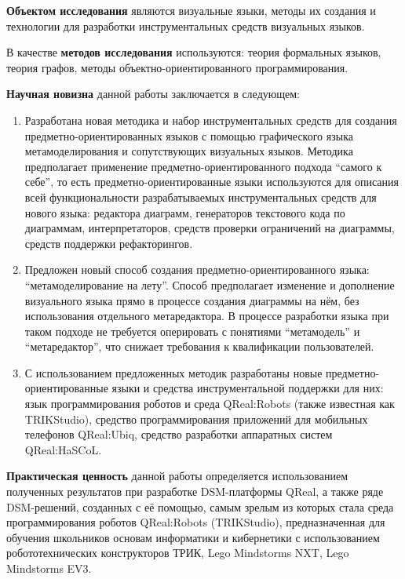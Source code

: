 \textbf{Объектом исследования} являются визуальные языки, методы их создания и технологии
для разработки инструментальных средств визуальных языков.

В качестве \textbf{методов исследования} используются: теория формальных языков, теория графов, 
методы объектно-ориентированного программирования.

\textbf{Научная новизна} данной работы заключается в следующем:
\begin{enumerate}
	\item Разработана новая методика и набор инструментальных средств для создания предметно-ориентированных 
		языков с помощью графического языка метамоделирования и сопутствующих визуальных языков.
		Методика предполагает применение предметно-ориентированного подхода "`самого к себе"', то есть
		предметно-ориентированные языки используются для описания всей функциональности разрабатываемых
		инструментальных средств для нового языка: редактора диаграмм, генераторов текстового кода по 
		диаграммам, интерпретаторов, средств проверки ограничений на диаграммы, средств поддержки рефакторингов.
	\item Предложен новый способ создания предметно-ориентированного языка: "`метамоделирование на лету"'. 
		Способ предполагает изменение и дополнение визуального языка прямо в процессе создания диаграммы на нём,
		без использования отдельного метаредактора. В процессе разработки языка при таком подходе
		не требуется оперировать с понятиями "`метамодель"' и "`метаредактор"', что снижает 
		требования к квалификации пользователей.
	\item С использованием предложенных методик разработаны новые предметно-ориентированные языки и
		средства инструментальной поддержки для них: язык программирования роботов и среда QReal:Robots
		(также известная как TRIKStudio), средство программирования приложений для мобильных телефонов 
		QReal:Ubiq, средство разработки аппаратных систем QReal:HaSCoL.
\end{enumerate}

\textbf{Практическая ценность} данной работы определяется использованием полученных 
результатов при разработке DSM-платформы QReal, а также ряде DSM-решений, созданных с её помощью, 
самым зрелым из которых стала среда программирования роботов QReal:Robots (TRIKStudio), 
предназначенная для обучения школьников основам информатики и кибернетики с использованием робототехнических 
конструкторов ТРИК, Lego Mindstorms NXT, Lego Mindstorms EV3.

